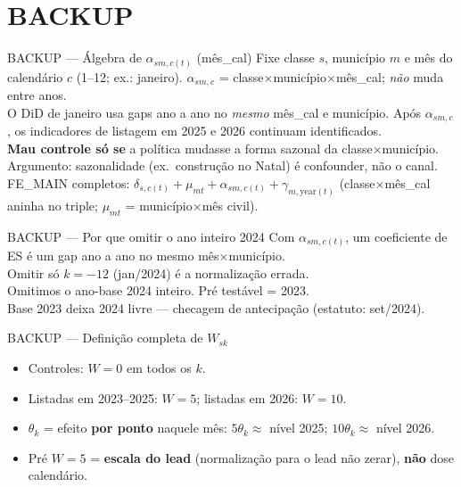 \documentclass[aspectratio=169,11pt]{beamer}
\begin{document}
\section*{BACKUP}

\begin{frame}{BACKUP --- Álgebra de \(\alpha_{sm,c(t)}\) (mês\_cal)}
Fixe classe \(s\), município \(m\) e mês do calendário \(c\) (1--12; ex.: janeiro). \(\alpha_{sm,c}\) = classe\(\times\)município\(\times\)mês\_cal; \emph{não} muda entre anos.\\[0.4em]
O DiD de janeiro usa gaps ano a ano no \emph{mesmo} mês\_cal e município. Após \(\alpha_{sm,c}\), os indicadores de listagem em 2025 e 2026 continuam identificados.\\[0.4em]
\textbf{Mau controle só se} a política mudasse a forma sazonal da classe\(\times\)município.\\
Argumento: sazonalidade (ex.\ construção no Natal) é confounder, não o canal.\\
FE\_MAIN completos: \(\delta_{s,c(t)}+\mu_{mt}+\alpha_{sm,c(t)}+\gamma_{m,\mathrm{year}(t)}\)
(classe\(\times\)mês\_cal aninha no triple; \(\mu_{mt}\) = município\(\times\)mês civil).
\end{frame}

\begin{frame}{BACKUP --- Por que omitir o ano inteiro 2024}
Com \(\alpha_{sm,c(t)}\), um coeficiente de ES é um gap ano a ano no mesmo mês\(\times\)município.\\
Omitir só \(k=-12\) (jan/2024) é a normalização errada.\\[0.4em]
Omitimos o ano-base 2024 inteiro. Pré testável = 2023.\\
Base 2023 deixa 2024 livre --- checagem de antecipação (estatuto: set/2024).
\end{frame}

\begin{frame}{BACKUP --- Definição completa de \(W_{sk}\)}
\begin{itemize}
  \item Controles: \(W=0\) em todos os \(k\).
  \item Listadas em 2023--2025: \(W=5\); listadas em 2026: \(W=10\).
  \item \(\theta_k\) = efeito \textbf{por ponto} naquele mês: \(5\theta_k\approx\) nível 2025; \(10\theta_k\approx\) nível 2026.
  \item Pré \(W=5\) = \textbf{escala do lead} (normalização para o lead não zerar), \textbf{não} dose calendário.
\end{itemize}
\end{frame}
\end{document}
